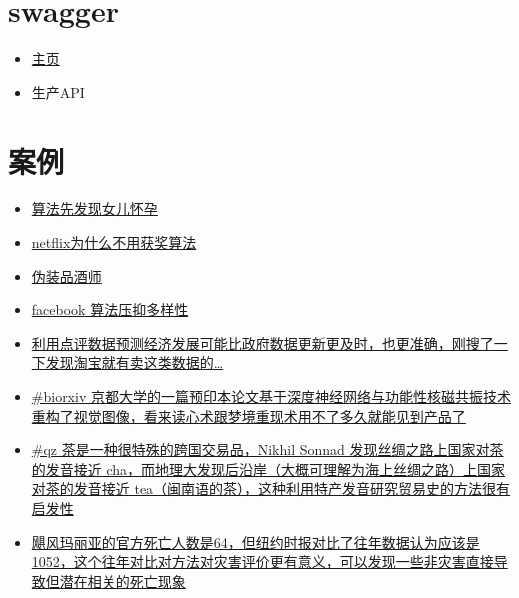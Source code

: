 \documentclass[]{book}
\providecommand{\tightlist}{%
  \setlength{\itemsep}{0pt}\setlength{\parskip}{0pt}}
\begin{document}
\hypertarget{swagger}{%
\section{swagger}\label{swagger}}

\begin{itemize}
\tightlist
\item
  \href{https://swagger.io/}{主页}
\item
  生产API
\end{itemize}

\hypertarget{ux6848ux4f8b}{%
\section{案例}\label{ux6848ux4f8b}}

\begin{itemize}
\item
  \href{https://www.forbes.com/sites/kashmirhill/2012/02/16/how-target-figured-out-a-teen-girl-was-pregnant-before-her-father-did/\#304228956668}{算法先发现女儿怀孕}
\item
  \href{https://www.techdirt.com/articles/20120409/03412518422/why-netflix-never-implemented-algorithm-that-won-netflix-1-million-challenge.shtml}{netflix为什么不用获奖算法}
\item
  \href{http://www.onthelambda.com/2014/02/20/how-to-fake-a-sophisticated-knowledge-of-wine-with-markov-chains/}{伪装品酒师}
\item
  \href{https://medium.com/message/how-facebook-s-algorithm-suppresses-content-diversity-modestly-how-the-newsfeed-rules-the-clicks-b5f8a4bb7bab}{facebook 算法压抑多样性}
\item
  \href{http://voxeu.org/article/measuring-local-economy-yelp-data}{利用点评数据预测经济发展可能比政府数据更新更及时，也更准确，刚搜了一下发现淘宝就有卖这类数据的\ldots{}}
\item
  \href{https://www.biorxiv.org/content/early/2017/12/30/240317}{\#biorxiv 京都大学的一篇预印本论文基于深度神经网络与功能性核磁共振技术重构了视觉图像，看来读心术跟梦境重现术用不了多久就能见到产品了}
\item
  \href{https://qz.com/1176962/map-how-the-word-tea-spread-over-land-and-sea-to-conquer-the-world/}{\#qz 茶是一种很特殊的跨国交易品，Nikhil Sonnad 发现丝绸之路上国家对茶的发音接近 cha，而地理大发现后沿岸（大概可理解为海上丝绸之路）上国家对茶的发音接近 tea（闽南语的茶），这种利用特产发音研究贸易史的方法很有启发性}
\item
  \href{https://www.nytimes.com/interactive/2017/12/08/us/puerto-rico-hurricane-maria-death-toll.html?_r=0}{飓风玛丽亚的官方死亡人数是64，但纽约时报对比了往年数据认为应该是1052，这个往年对比对方法对灾害评价更有意义，可以发现一些非灾害直接导致但潜在相关的死亡现象}

\end{itemize}
\end{document}
